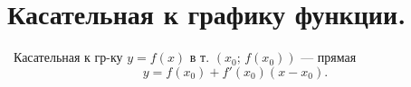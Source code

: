 \section{Касательная к графику функции.}

\begin{definition}
\ Касательная к гр-ку $y=f(x)$ в т. $(x_0;\,f(x_0))$ — прямая
\[
y=f(x_0)+f'(x_0)(x-x_0).
\]
\end{definition}